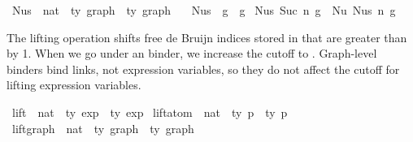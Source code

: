 \begin{isabellebody}
\isanewline
{}\isamarkupfalse%
\ Nus{}\ {\isacharcolon}{\kern0pt}{\isacharcolon}{\kern0pt}\ {\isachardoublequoteopen}nat\ {\isacharequal}{\kern0pt}{\isachargreater}{\kern0pt}\ {\isacharprime}{\kern0pt}ty\ graph\ {\isacharequal}{\kern0pt}{\isachargreater}{\kern0pt}\ {\isacharprime}{\kern0pt}ty\ graph{\isachardoublequoteclose}\ \isanewline
\ \ {\isachardoublequoteopen}Nus{}\ {}\ g\ {\isacharequal}{\kern0pt}\ g{\isachardoublequoteclose}\isanewline
{\isacharbar}{\kern0pt}\ {\isachardoublequoteopen}Nus{}\ {\isacharparenleft}{\kern0pt}Suc\ n{\isacharparenright}{\kern0pt}\ g\ {\isacharequal}{\kern0pt}\ Nu\ {\isacharparenleft}{\kern0pt}Nus{}\ n\ g{\isacharparenright}{\kern0pt}{\isachardoublequoteclose}%
\isadelimdocument
%
\endisadelimdocument
%
\isatagdocument
%
\isamarkuptrue%
%
\endisatagdocument
{\isafolddocument}%
%
\isadelimdocument
%
\endisadelimdocument
%
\begin{isamarkuptext}%
The lifting operation  shifts free de Bruijn indices
  stored in  that are greater than by 1.
  When we go under an  binder, we increase the cutoff to .
  Graph-level binders  bind links, not expression variables,
  so they do not affect the cutoff for lifting expression variables.%
\end{isamarkuptext}\isamarkuptrue%
\isamarkupfalse%
\ lift\ {\isacharcolon}{\kern0pt}{\isacharcolon}{\kern0pt}\ {\isachardoublequoteopen}nat\ {\isacharequal}{\kern0pt}{\isachargreater}{\kern0pt}\ {\isacharprime}{\kern0pt}ty\ exp\ {\isacharequal}{\kern0pt}{\isachargreater}{\kern0pt}\ {\isacharprime}{\kern0pt}ty\ exp{\isachardoublequoteclose}\isanewline
{}\ lift{\isacharunderscore}{\kern0pt}atom\ {\isacharcolon}{\kern0pt}{\isacharcolon}{\kern0pt}\ {\isachardoublequoteopen}nat\ {\isacharequal}{\kern0pt}{\isachargreater}{\kern0pt}\ {\isacharprime}{\kern0pt}ty\ p\ {\isacharequal}{\kern0pt}{\isachargreater}{\kern0pt}\ {\isacharprime}{\kern0pt}ty\ p{\isachardoublequoteclose}\isanewline
{}\ lift{\isacharunderscore}{\kern0pt}graph\ {\isacharcolon}{\kern0pt}{\isacharcolon}{\kern0pt}\ {\isachardoublequoteopen}nat\ {\isacharequal}{\kern0pt}{\isachargreater}{\kern0pt}\ {\isacharprime}{\kern0pt}ty\ graph\ {\isacharequal}{\kern0pt}{\isachargreater}{\kern0pt}\ {\isacharprime}{\kern0pt}ty\ graph{\isachardoublequoteclose}\isanewline

\end{isabellebody}
